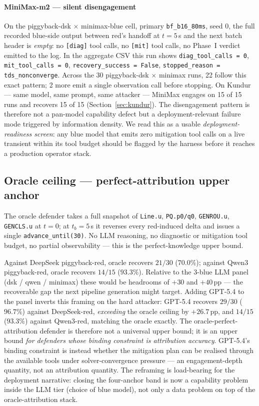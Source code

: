 \documentclass[journal,twocolumn,10pt]{IEEEtran}
\begin{document}
\paragraph*{MiniMax-m2 --- silent disengagement}
On the piggyback-dsk $\times$ minimax-blue cell, primary \texttt{bf\_b16\_80ms}, seed 0, the full recorded blue-side output between red's handoff at $t = 5$\,s and the next batch header is \emph{empty}: no \texttt{[diag]} tool calls, no \texttt{[mit]} tool calls, no Phase~I verdict emitted to the log. In the aggregate CSV this run shows \texttt{diag\_tool\_calls = 0}, \texttt{mit\_tool\_calls = 0}, \texttt{recovery\_success = False}, \texttt{stopped\_reason = tds\_nonconverge}. Across the 30 piggyback-dsk $\times$ minimax runs, 22 follow this exact pattern; 2 more emit a single observation call before stopping. On Kundur --- same model, same prompt, same attacker --- MiniMax engages on 15 of 15 runs and recovers 15 of 15 (Section~\ref{sec:kundur}). The disengagement pattern is therefore not a pan-model capability defect but a deployment-relevant failure mode triggered by information density. We read this as a usable \emph{deployment-readiness screen}: any blue model that emits zero mitigation tool calls on a live transient within its tool budget should be flagged by the harness before it reaches a production operator stack.

\subsection{Oracle ceiling --- perfect-attribution upper anchor}
\label{sec:oracle}
The oracle defender takes a full snapshot of \texttt{Line.u}, \texttt{PQ.p0/q0}, \texttt{GENROU.u}, \texttt{GENCLS.u} at $t = 0$; at $t_b = 5$\,s it reverses every red-induced delta and issues a single \texttt{advance\_until(30)}. No LLM reasoning, no diagnostic or mitigation tool budget, no partial observability --- this is the perfect-knowledge upper bound.

Against DeepSeek piggyback-red, oracle recovers $21/30$ ($70.0\%$); against Qwen3 piggyback-red, oracle recovers $14/15$ ($93.3\%$). Relative to the 3-blue LLM panel (dsk / qwen / minimax) these would be headrooms of $+30$ and $+40$\,pp --- the recoverable gap the next pipeline generation might target. Adding GPT-5.4 to the panel inverts this framing on the hard attacker: GPT-5.4 recovers $29/30$ ($96.7\%$) against DeepSeek-red, \emph{exceeding} the oracle ceiling by $+26.7$\,pp, and $14/15$ ($93.3\%$) against Qwen3-red, matching the oracle exactly. The oracle-perfect-attribution defender is therefore not a universal upper bound; it is an upper bound \emph{for defenders whose binding constraint is attribution accuracy}. GPT-5.4's binding constraint is instead whether the mitigation plan can be realised through the available tools under solver-convergence pressure --- an engagement-depth quantity, not an attribution quantity. The reframing is load-bearing for the deployment narrative: closing the four-anchor band is now a capability problem inside the LLM tier (choice of blue model), not only a data problem on top of the oracle-attribution stack.
\end{document}
